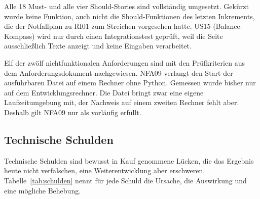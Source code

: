 Alle 18 Must- und alle vier Should-Stories sind vollständig umgesetzt. Gekürzt wurde keine Funktion, auch nicht die Should-Funktionen des letzten Inkrements, die der Notfallplan zu RI01 zum Streichen vorgesehen hatte. US15 (Balance-Kompass) wird nur durch einen Integrationstest geprüft, weil die Seite ausschließlich Texte anzeigt und keine Eingaben verarbeitet.

Elf der zwölf nichtfunktionalen Anforderungen sind mit den Prüfkriterien aus dem Anforderungsdokument nachgewiesen. NFA09 verlangt den Start der ausführbaren Datei auf einem Rechner ohne Python. Gemessen wurde bisher nur auf dem Entwicklungsrechner. Die Datei bringt zwar eine eigene Laufzeitumgebung mit, der Nachweis auf einem zweiten Rechner fehlt aber. Deshalb gilt NFA09 nur als vorläufig erfüllt.

\subsection{Technische Schulden}
Technische Schulden sind bewusst in Kauf genommene Lücken, die das Ergebnis heute nicht verfälschen, eine Weiterentwicklung aber erschweren. Tabelle~\ref{tab:schulden} nennt für jede Schuld die Ursache, die Auswirkung und eine mögliche Behebung.


